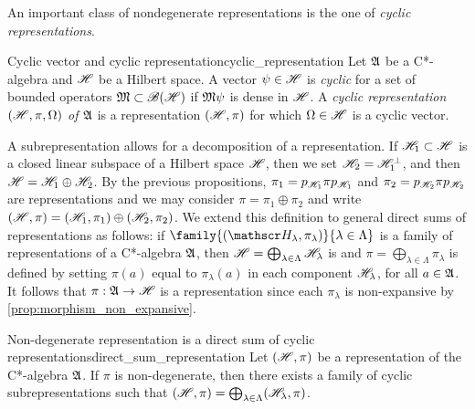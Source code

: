 An important class of nondegenerate representations is the one of \emph{cyclic representations}.
\begin{definition}{Cyclic vector and cyclic representation}{cyclic_representation}
    Let \(\mathfrak{A}\) be a C*-algebra and \(\mathscr{H}\) be a Hilbert space. A vector \(\psi \in \mathscr{H}\) is \emph{cyclic} for a set of bounded operators \(\mathfrak{M} \subset \mathscr{B}(\mathscr{H})\) if \(\mathfrak{M}\psi\) is dense in \(\mathscr{H}\). A \emph{cyclic representation \((\mathscr{H}, \pi, \Omega)\) of \(\mathfrak{A}\)} is a representation \((\mathscr{H}, \pi)\) for which \(\Omega \in \mathscr{H}\) is a cyclic vector.
\end{definition}

A subrepresentation allows for a decomposition of a representation. If \(\mathscr{H}_1 \subset \mathscr{H}\) is a closed linear subspace of a Hilbert space \(\mathscr{H}\), then we set \(\mathscr{H}_2 = \mathscr{H}_1^{\perp}\), and then \(\mathscr{H} = \mathscr{H}_1 \oplus \mathscr{H}_2\). By the previous propositions, \(\pi_1 = p_{\mathscr{H}_1} \pi p_{\mathscr{H}_1}\) and \(\pi_2 = p_{\mathscr{H}_2} \pi p_{\mathscr{H}_2}\) are representations and we may consider \(\pi = \pi_1 \oplus \pi_2\) and write \((\mathscr{H}, \pi) = (\mathscr{H}_1, \pi_1) \oplus (\mathscr{H}_2, \pi_2)\). We extend this definition to general direct sums of representations as follows: if \(\family{(\hilbert_{\lambda}, \pi_{\lambda})}{\lambda \in \Lambda}\) is a family of representations of a C*-algebra \(\mathfrak{A}\), then \(\mathscr{H} = \bigoplus_{\lambda \in \Lambda} \mathscr{H}_{\lambda}\) is  and \(\pi = \bigoplus_{\lambda \in \Lambda} \pi_{\lambda}\) is defined by setting \(\pi(a)\) equal to \(\pi_{\lambda}(a)\) in each component \(\mathscr{H}_{\lambda}\), for all \(a \in \mathfrak{A}\). It follows that \(\pi : \mathfrak{A} \to \mathscr{H}\) is a representation since each \(\pi_{\lambda}\) is non-expansive by \cref{prop:morphism_non_expansive}.
\begin{proposition}{Non-degenerate representation is a direct sum of cyclic representations}{direct_sum_representation}
    Let \((\mathscr{H}, \pi)\) be a representation of the C*-algebra \(\mathfrak{A}\). If \(\pi\) is non-degenerate, then there exists a family of cyclic subrepresentations \family{(\hilbert_{\lambda}, \pi_{\lambda}, \Omega_\lambda)}{\lambda \in \Lambda} such that \((\mathscr{H}, \pi) = \bigoplus_{\lambda \in \Lambda}(\mathscr{H}_{\lambda}, \pi)\).
\end{proposition}
